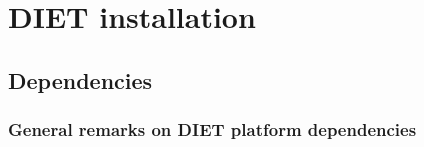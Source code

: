 
\chapter{DIET installation}
\label{ch:installing}

\section{Dependencies}
\label{sec:dependencies}

\subsection{General remarks on DIET platform dependencies}

